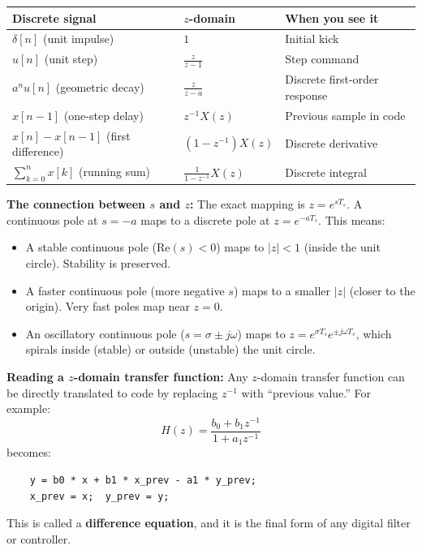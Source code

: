 \begin{center}
\begin{tabular}{lll}
\toprule
\textbf{Discrete signal} & \textbf{$z$-domain} & \textbf{When you see it} \\
\midrule
$\delta[n]$ (unit impulse) & $1$ & Initial kick \\
$u[n]$ (unit step) & $\frac{z}{z-1}$ & Step command \\
$a^n u[n]$ (geometric decay) & $\frac{z}{z-a}$ & Discrete first-order response \\
$x[n-1]$ (one-step delay) & $z^{-1}X(z)$ & Previous sample in code \\
$x[n] - x[n-1]$ (first difference) & $(1 - z^{-1})X(z)$ & Discrete derivative \\
$\sum_{k=0}^{n} x[k]$ (running sum) & $\frac{1}{1 - z^{-1}}X(z)$ & Discrete integral \\
\bottomrule
\end{tabular}
\end{center}

\textbf{The connection between $s$ and $z$:} The exact mapping is $z = e^{sT_s}$. A continuous pole at $s = -a$ maps to a discrete pole at $z = e^{-aT_s}$. This means:
\begin{itemize}
    \item A stable continuous pole ($\text{Re}(s) < 0$) maps to $|z| < 1$ (inside the unit circle). Stability is preserved.
    \item A faster continuous pole (more negative $s$) maps to a smaller $|z|$ (closer to the origin). Very fast poles map near $z = 0$.
    \item An oscillatory continuous pole ($s = \sigma \pm j\omega$) maps to $z = e^{\sigma T_s} e^{\pm j\omega T_s}$, which spirals inside (stable) or outside (unstable) the unit circle.
\end{itemize}

\textbf{Reading a $z$-domain transfer function:} Any $z$-domain transfer function can be directly translated to code by replacing $z^{-1}$ with ``previous value.'' For example:
\[
H(z) = \frac{b_0 + b_1 z^{-1}}{1 + a_1 z^{-1}}
\]
becomes:
\begin{verbatim}
    y = b0 * x + b1 * x_prev - a1 * y_prev;
    x_prev = x;  y_prev = y;
\end{verbatim}
This is called a \textbf{difference equation}, and it is the final form of any digital filter or controller.
